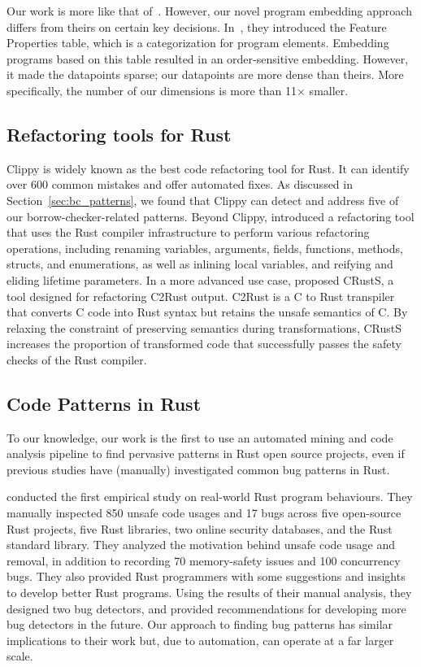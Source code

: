 Our work is more like that of~\cite{hanam2016discovering}. However, our novel program embedding approach differs from theirs on certain key decisions. In~\cite{hanam2016discovering}, they introduced the Feature Properties table, which is a categorization for program elements. Embedding programs based on this table resulted in an order-sensitive embedding. However, it made the datapoints sparse; our datapoints are more dense than theirs. More specifically, the number of our dimensions is more than 11$\times$ smaller.

\subsection{Refactoring tools for Rust}
Clippy is widely known as the best code refactoring tool for Rust. It can identify over 600 common mistakes and offer automated fixes.
As discussed in Section~\ref{sec:bc_patterns}, we found that Clippy can detect and address five of our borrow-checker-related patterns. Beyond Clippy, \cite{sam2017automated} introduced a refactoring tool that uses the Rust compiler infrastructure to perform various refactoring operations, including renaming variables, arguments, fields, functions, methods, structs, and enumerations, as well as inlining local variables, and reifying and eliding lifetime parameters. In a more advanced use case, \cite{ling2022rust} proposed CRustS, a tool designed for refactoring C2Rust output. C2Rust is a C to Rust transpiler that converts C code into Rust syntax but retains the unsafe semantics of C. By relaxing the constraint of preserving semantics during transformations, CRustS increases the proportion of transformed code that successfully passes the safety checks of the Rust compiler.

\subsection{Code Patterns in Rust}

To our knowledge, our work is the first to use an automated mining and code analysis pipeline to find pervasive patterns in Rust open source projects, even if previous studies have (manually) investigated common bug patterns in Rust.

\cite{qin2020understanding} conducted the first empirical study on real-world Rust program behaviours. They manually inspected 850 unsafe code usages and 17 bugs across five open-source Rust projects, five Rust libraries, two online security databases, and the Rust standard library. They analyzed the motivation behind unsafe code usage and removal, in addition to recording 70 memory-safety issues and 100 concurrency bugs. They also provided Rust programmers with some suggestions and insights to develop better Rust programs. Using the results of their manual analysis, they designed two bug detectors, and provided recommendations for developing more bug detectors in the future. Our approach to finding bug patterns has similar implications to their work but, due to automation, can operate at a far larger scale.

